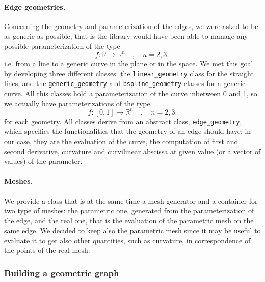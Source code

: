\documentclass[11pt]{article} %
\newcommand{\classname}[1]{\texttt{#1}}
\begin{document}
		\paragraph{Edge geometries.} Concerning the geometry and parameterization of the edges, we were asked to be as generic as possible, that is the library would have been able to manage any possible parameterization of the type
		\begin{equation*}
			f:\mathbb{R}\rightarrow\mathbb{R}^{n} \quad, \quad n=2,3 ,
		\end{equation*}
		i.e. from a line to a generic curve in the plane or in the space. We met this goal by developing three different classes: the \classname{linear\_geometry} class for the straight lines, and the \classname{generic\_geometry} and \classname{bspline\_geometry} classes for a generic curve.\newline
		All this classes hold a parameterization of the curve inbetween 0 and 1, so we actually have parameterizations of the type
		\begin{equation*}
			f:[0,1]\rightarrow\mathbb{R}^{n} \quad, \quad n=2,3.
		\end{equation*}
		for each geometry. All classes derive from an abstract class, \classname{edge\_geometry}, which specifies the functionalities that the geometry of an edge should have: in our case, they are the evaluation of the curve, the computation of first and second derivative, curvature and curvilinear abscissa at given value (or a vector of values) of the parameter.
		\paragraph{Meshes.} We provide a class that is at the same time a mesh generator and a container for two type of meshes: the parametric one, generated from the parameterization of the edge, and the real one, that is the evaluation of the parametric mesh on the same edge. We decided to keep also the parametric mesh since it may be useful to evaluate it to get also other quantities, such as curvature, in correspondence of the points of the real mesh.
		
		
		
		\subsubsection{Building a geometric graph}		
\end{document}
